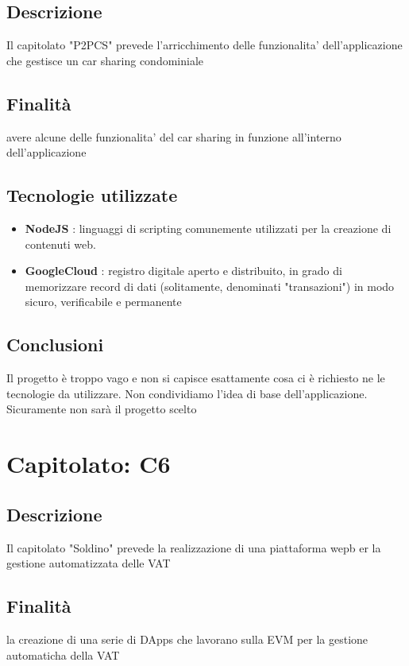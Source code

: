 \documentclass{article}
\begin{document}
\subsection{Descrizione}
Il capitolato "P2PCS" prevede l'arricchimento delle funzionalita' dell'applicazione che gestisce un car sharing condominiale
\subsection{Finalità}
avere alcune delle funzionalita' del car sharing in funzione all'interno dell'applicazione
\subsection{Tecnologie utilizzate}
\begin{itemize}
	\item \textbf{NodeJS} : linguaggi di scripting comunemente utilizzati per la creazione di contenuti web.
	\item \textbf{GoogleCloud} : registro digitale aperto e distribuito, in grado di memorizzare record di dati (solitamente, denominati "transazioni") in modo sicuro, verificabile e permanente
\end{itemize}
\subsection{Conclusioni}
Il progetto è troppo vago e non si capisce esattamente cosa ci è richiesto ne le tecnologie da utilizzare.
Non condividiamo l'idea di base dell'applicazione. Sicuramente non sarà il progetto scelto
\newpage

\newpage
\section{Capitolato: C6}
\subsection{Descrizione}
Il capitolato "Soldino" prevede la realizzazione di una piattaforma wepb er la gestione automatizzata delle VAT
\subsection{Finalità}
la creazione di una serie di DApps che lavorano sulla EVM per la gestione automaticha della VAT
\end{document}
